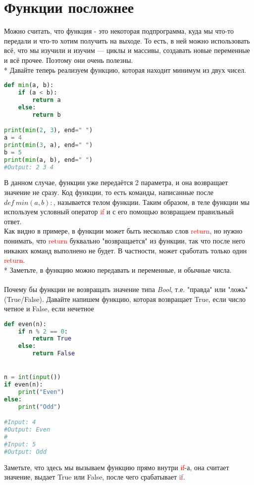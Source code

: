 \documentclass[12pt]{article} %
\begin{document}
\section{Функции посложнее}
Можно считать, что функция - это некоторая подпрограмма, куда мы что-то передали и что-то хотим получить на выходе. То есть, в ней можно использовать всё, что мы изучили и изучим --- циклы и массивы, создавать новые переменные и всё прочее. Поэтому они очень полезны.
\\* Давайте теперь реализуем функцию, которая находит минимум из двух чисел.
\begin{lstlisting}[language=Python]
def min(a, b):
    if (a < b):
        return a
    else:
        return b

print(min(2, 3), end=" ")
a = 4
print(min(3, a), end=" ")
b = 5
print(min(a, b), end=" ")
#Output: 2 3 4

\end{lstlisting}
В данном случае, функции уже передаётся 2 параметра, и она возвращает значение не сразу. Код функции, то есть команды, написанные после $def \ min(a, b):$, называется телом функции. Таким образом, в теле функции мы используем условный оператор \textcolor{red}{if} и с его помощью возвращаем правильный ответ. \\
Как видно в примере, в функции может быть несколько слов \textcolor{red}{return}, но нужно понимать, что \textcolor{red}{return} буквально "возвращается" из функции, так что после него никаких команд выполнено не будет. В частности, может сработать только один \textcolor{red}{return}.
\\* Заметьте, в функцию можно передавать и переменные, и обычные числа.\\
\\
Почему бы функции не возвращать значение типа \textit{Bool}, т.е. "правда" или "ложь" (True/False).
Давайте напишем функцию, которая возвращает True, если число четное и False, если нечетное
\begin{lstlisting}[language=Python]
def even(n):
	if n % 2 == 0:
		return True
	else:
		return False


n = int(input())
if even(n):
	print("Even")
else: 
	print("Odd")

#Input: 4
#Output: Even
#
#Input: 5
#Output: Odd
\end{lstlisting}
Заметьте, что здесь мы вызываем функцию прямо внутри \textcolor{red}{if}-а, она считает значение, выдает True или False, после чего срабатывает \textcolor{red}{if}.
\end{document}
